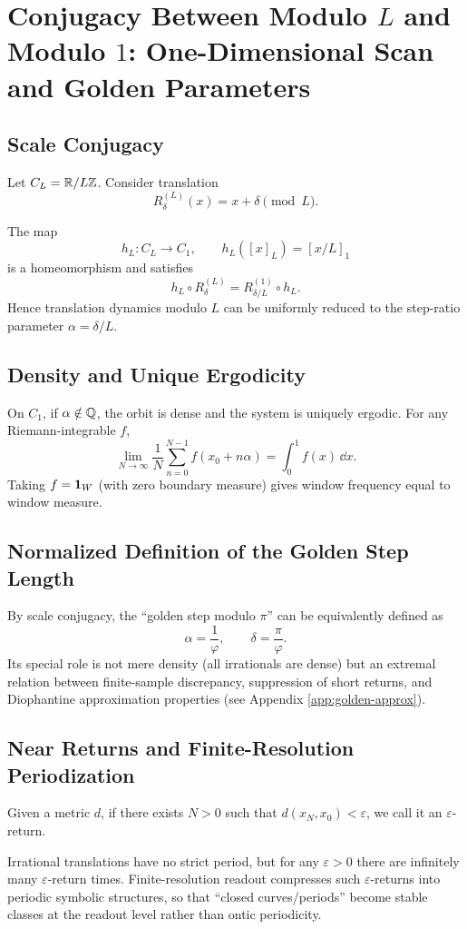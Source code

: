 ﻿\section{Conjugacy Between Modulo \texorpdfstring{$L$}{L} and Modulo \texorpdfstring{$1$}{1}: One-Dimensional Scan and Golden Parameters}

\subsection{Scale Conjugacy}

Let $C_L=\mathbb{R}/L\mathbb{Z}$. Consider translation
\[
R_\delta^{(L)}(x)=x+\delta\pmod{L}.
\]

\begin{proposition}\label{prop:conjugacy}
The map
\[
h_L:C_L\to C_1,\qquad h_L([x]_L)=[x/L]_1
\]
is a homeomorphism and satisfies
\[
h_L\circ R_\delta^{(L)}=R_{\delta/L}^{(1)}\circ h_L.
\]
Hence translation dynamics modulo $L$ can be uniformly reduced to the step-ratio parameter $\alpha=\delta/L$.
\end{proposition}

\subsection{Density and Unique Ergodicity}

On $C_1$, if $\alpha\notin\mathbb{Q}$, the orbit is dense and the system is uniquely ergodic. For any Riemann-integrable $f$,
\[
\lim_{N\to\infty}\frac{1}{N}\sum_{n=0}^{N-1}f(x_0+n\alpha)=\int_0^1 f(x)\,\dd x.
\]
Taking $f=\mathbf{1}_W$ (with zero boundary measure) gives window frequency equal to window measure.

\subsection{Normalized Definition of the Golden Step Length}

By scale conjugacy, the ``golden step modulo $\pi$'' can be equivalently defined as
\[
\alpha=\frac{1}{\varphi},\qquad \delta=\frac{\pi}{\varphi}.
\]
Its special role is not mere density (all irrationals are dense) but an extremal relation between finite-sample discrepancy, suppression of short returns, and Diophantine approximation properties (see Appendix \ref{app:golden-approx}).

\subsection{Near Returns and Finite-Resolution Periodization}

\begin{definition}
Given a metric $d$, if there exists $N>0$ such that $d(x_N,x_0)<\varepsilon$, we call it an $\varepsilon$-return.
\end{definition}
Irrational translations have no strict period, but for any $\varepsilon>0$ there are infinitely many $\varepsilon$-return times. Finite-resolution readout compresses such $\varepsilon$-returns into periodic symbolic structures, so that ``closed curves/periods'' become stable classes at the readout level rather than ontic periodicity.
